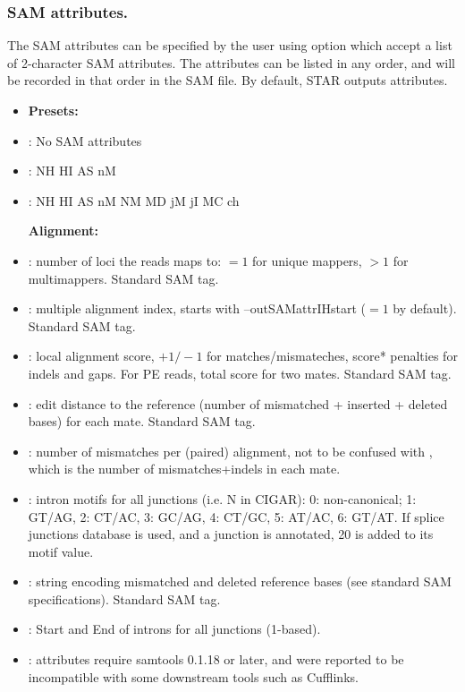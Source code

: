 \documentclass[12pt]{article}
\begin{document}
\subsubsection{SAM attributes.}
The SAM attributes can be specified by the user using   option which accept a list of 2-character SAM attributes. The attributes can be listed in any order, and will be recorded in that order in the SAM file. By default, STAR outputs  attributes.

\begin{itemize}[itemsep=1pt]
\item[]
\textbf{Presets:}
%
\item[]
 : No SAM attributes
%
\item[]
 : NH HI AS nM
%
\item[]
 : NH HI AS nM NM MD jM jI MC ch

\textbf{Alignment:}
%
\item[]
 : number of loci the reads maps to: $=1$ for unique mappers, $>1$ for multimappers. Standard SAM tag.
%
\item[]
  : multiple alignment index, starts with --outSAMattrIHstart ($=1$ by default). Standard SAM tag.
%
\item[]
 : local alignment score, $+1/-1$ for matches/mismateches, score* penalties for indels and gaps. For PE reads, total score for two mates. Standard SAM tag.
%
\item[]
 : edit distance to the reference (number of mismatched + inserted + deleted bases) for each mate. Standard SAM tag.
%
\item[]
 : number of mismatches per (paired) alignment, not to be confused with , which is the number of mismatches+indels in each mate.
%
\item[]
 : intron motifs for all junctions (i.e. N in CIGAR): 0: non-canonical; 1: GT/AG, 2: CT/AC, 3: GC/AG, 4: CT/GC, 5: AT/AC, 6: GT/AT. If splice junctions database is used, and a junction is annotated, 20 is added to its motif value.
%
\item[]
 : string encoding mismatched and deleted reference bases (see standard SAM specifications). Standard SAM tag.
%
\item[]
 : Start and End of introns for all junctions (1-based).
%
\item[]
 : attributes require samtools 0.1.18 or later, and were reported to be incompatible with some downstream tools such as Cufflinks.


\end{itemize}
\end{document}
